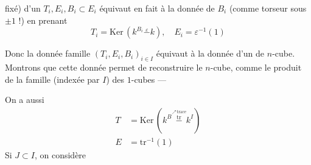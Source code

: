 fixé) d'un $T_i,E_i,B_i\subset E_i$ équivaut en fait
à la donnée de $B_i$ (comme torseur sous
$\pm1$ !) en prenant
\[
T_i=\mathrm{Ker}\,(k^{B_i}\overset{\varepsilon}{-}k),\quad E_i=\varepsilon^{-1}(1)
\]

Donc la donnée    famille $(T_i,E_i,B_i)_{i\in I}$
 équivaut à
la donnée d'un  de $n$-cube.
Montrons que cette donnée permet de
reconstruire le $n$-cube, comme le
produit de la famille (indexée par $I$)
des $1$-cubes ---

On a aussi
\[
\begin{aligned}
T&=\mathrm{Ker}\,(k^B\overset{\overset{\nearrow\,\text{trace}}{\mathrm{tr}}}{-}k^I)\\
E&=\mathrm{tr}^{-1}(1)
\end{aligned}
\]
Si $J\subset I$, on considère
